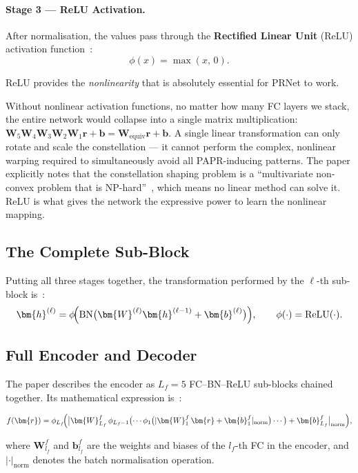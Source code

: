 \paragraph{Stage 3 --- ReLU Activation.}
After normalisation, the values pass through the \textbf{Rectified Linear Unit} (ReLU) activation function~\cite{kim2017novel}:
\begin{equation*}
    \phi(x) = \max(x,\, 0).
\end{equation*}

ReLU provides the \emph{nonlinearity} that is absolutely essential for PRNet to work.

\begin{keyinsight}
    Without nonlinear activation functions, no matter how many FC layers we stack, the entire network would collapse into a single matrix multiplication: $\bm{W}_5 \bm{W}_4 \bm{W}_3 \bm{W}_2 \bm{W}_1 \bm{r} + \bm{b} = \bm{W}_{\mathrm{equiv}} \bm{r} + \bm{b}$. A single linear transformation can only rotate and scale the constellation --- it cannot perform the complex, nonlinear warping required to simultaneously avoid all PAPR-inducing patterns.  The paper explicitly notes that the constellation shaping problem is a ``multivariate non-convex problem that is NP-hard''~\cite{kim2017novel}, which means no linear method can solve it.  ReLU is what gives the network the expressive power to learn the nonlinear mapping.
\end{keyinsight}


\subsection{The Complete Sub-Block}

Putting all three stages together, the transformation performed by the $\ell$-th sub-block is~\cite{kim2017novel}:
\begin{equation*}
    \bm{h}^{(\ell)}
    = \phi\!\Bigl(
    \mathrm{BN}\bigl(\bm{W}^{(\ell)}\bm{h}^{(\ell-1)}
        + \bm{b}^{(\ell)}\bigr)
    \Bigr),
    \qquad \phi(\cdot) = \mathrm{ReLU}(\cdot).
\end{equation*}


\subsection{Full Encoder and Decoder}

The paper describes the encoder as $L_f = 5$ FC--BN--ReLU sub-blocks chained together.  Its mathematical expression is~\cite{kim2017novel}:
\begin{keyresult}
    \begin{equation}
        f(\bm{r})
        = \phi_{L_f}\!\Bigl(
        \bigl|\bm{W}_{L_f}^f\,
        \phi_{L_f-1}\bigl(\cdots
        \phi_1\bigl(|\bm{W}_1^f\,\bm{r}
            + \bm{b}_1^f|_{\mathrm{norm}}\bigr)
        \cdots\bigr)
        + \bm{b}_{L_f}^f\bigr|_{\mathrm{norm}}
        \Bigr),
    \end{equation}
\end{keyresult}
where $\bm{W}_{l_f}^f$ and $\bm{b}_{l_f}^f$ are the weights and biases of the $l_f$-th FC in the encoder, and $|\cdot|_{\mathrm{norm}}$ denotes the batch normalisation operation.

